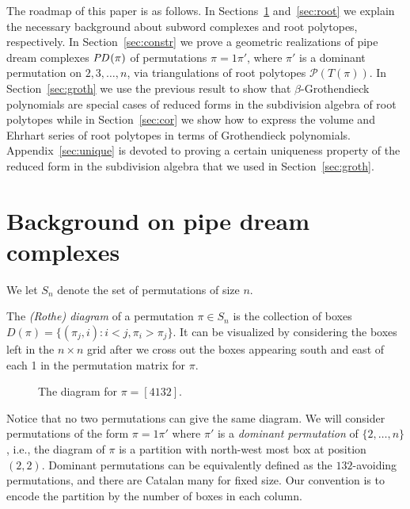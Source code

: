 \documentclass[ALCO,ThmDefs]{cedram}
\numberwithin{equation}{section}
\renewcommand*\P{{\mathcal{P}}}
\newcommand*\+{\smash{\lower2pt\hbox{\rlap{\vrule height14pt}}\raise2pt\hbox{\rlap{\hskip-3pt \vrule height.4pt depth0pt width14.7pt}}}}
\newcommand*{\MK}{\mkern 2mu}
\DeclareMathOperator{\PD}{\textit{PD}\MK}
\begin{document}
The roadmap of this paper is as follows. In Sections~\ref{sec:pipe} and~\ref{sec:root} we explain the necessary background about subword complexes and root polytopes, respectively. In Section~\ref{sec:constr} we prove a geometric realizations of pipe dream complexes $\PD(\pi)$ of permutations $\pi=1\pi'$, where $\pi'$ is a dominant permutation on $2,3,\dots, n$, via triangulations of root polytopes $\P(T(\pi))$. In Section~\ref{sec:groth} we use the previous result to show that $\beta$-Grothendieck polynomials are special cases of reduced forms in the subdivision algebra of root polytopes while in Section~\ref{sec:cor} we show how to express the volume and Ehrhart series of root polytopes in terms of Grothendieck polynomials. Appendix~\ref{sec:unique} is devoted to proving a certain uniqueness property of the reduced form in the subdivision algebra that we used in Section~\ref{sec:groth}.


\section{Background on pipe dream complexes}\label{sec:pipe}

We let $S_n$ denote the set of permutations of size $n$.

\begin{defi}
The \emph{(Rothe) diagram} of a permutation $\pi\in S_n$ is the collection of boxes $D(\pi)=\{(\pi_j,i): i<j, \pi_i>\pi_j\}$. It can be visualized by considering the boxes left in the $n\times n$ grid after we cross out the boxes appearing south and east of each 1 in the permutation matrix for $\pi$.
\end{defi}

\begin{figure}[h]
\caption{The diagram for $\pi=[4132]$.}
\end{figure}

Notice that no two permutations can give the same diagram. We will consider permutations of the form $\pi=1\pi'$ where $\pi'$ is a \emph{dominant permutation} of $\{2,\dots,n\}$, i.e., the diagram of $\pi$ is a partition with north-west most box at position $(2,2)$. Dominant permutations can be equivalently defined as the $132$-avoiding permutations, and there are Catalan many for fixed size. Our convention is to encode the partition by the number of boxes in each column.
\end{document}
